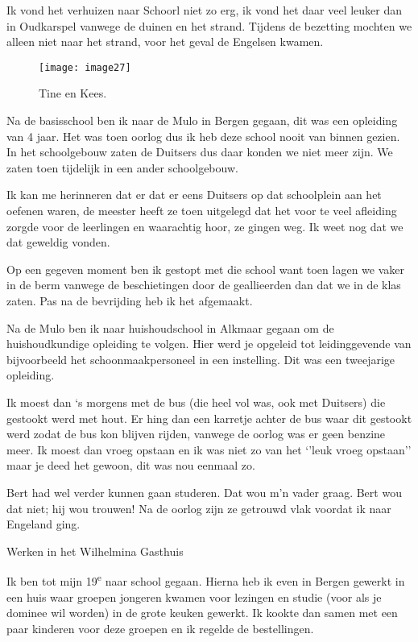 Ik vond het verhuizen naar Schoorl niet zo erg, ik vond het daar veel leuker dan in Oudkarspel vanwege de duinen en het strand. Tijdens de bezetting mochten we alleen niet naar het strand, voor het geval de Engelsen kwamen. 

\begin{figure}[h]
    \texttt{[image: image27]}
    \caption{Tine en Kees.}
\end{figure}

Na de basisschool ben ik naar de Mulo in Bergen gegaan, dit was een opleiding van 4 jaar. Het was toen oorlog dus ik heb deze school nooit van binnen gezien. In het schoolgebouw zaten de Duitsers dus daar konden we niet meer zijn. We zaten toen tijdelijk in een ander schoolgebouw. 

Ik kan me herinneren dat er dat er eens Duitsers op dat schoolplein aan het oefenen waren, de meester heeft ze toen uitgelegd dat het voor te veel afleiding zorgde voor de leerlingen en waarachtig hoor, ze gingen weg. Ik weet nog dat we dat geweldig vonden.

Op een gegeven moment ben ik gestopt met die school want toen lagen we vaker in de berm vanwege de beschietingen door de geallieerden dan dat we in de klas zaten. Pas na de bevrijding heb ik het afgemaakt.

Na de Mulo ben ik naar huishoudschool in Alkmaar gegaan om de huishoudkundige opleiding te volgen. Hier werd je opgeleid tot leidinggevende van bijvoorbeeld het schoonmaakpersoneel in een instelling. Dit was een tweejarige opleiding. 

Ik moest dan ‘s morgens met de bus (die heel vol was, ook met Duitsers) die gestookt werd met hout. Er hing dan een karretje achter de bus waar dit gestookt werd zodat de bus kon blijven rijden, vanwege de oorlog was er geen benzine meer. Ik moest dan vroeg opstaan en ik was niet zo van het ‘’leuk vroeg opstaan’’ maar je deed het gewoon, dit was nou eenmaal zo. 

Bert had wel verder kunnen gaan studeren. Dat wou m’n vader graag. Bert wou dat niet; hij wou trouwen! Na de oorlog zijn ze getrouwd vlak voordat ik naar Engeland ging.

Werken in het Wilhelmina Gasthuis

Ik ben tot mijn 19\textsuperscript{e} naar school gegaan. Hierna heb ik even in Bergen gewerkt in een huis waar groepen jongeren kwamen voor lezingen en studie (voor als je dominee wil worden) in de grote keuken gewerkt. Ik kookte dan samen met een paar kinderen voor deze groepen en ik regelde de bestellingen. 